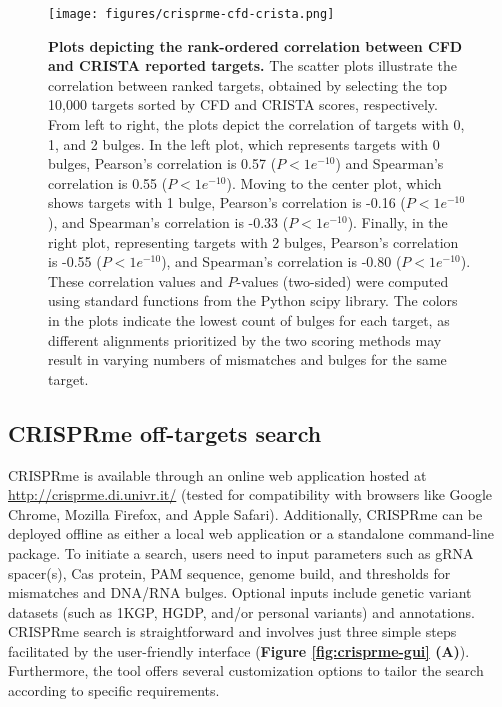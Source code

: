 \documentclass[a4paper, titlepage, openright]{book}
\newcommand{\crisprme}{CRISPRme\xspace}
\begin{document}
\begin{figure}[!]
    \centering
    \texttt{[image: figures/crisprme-cfd-crista.png]}
    \caption[Plots depicting the rank-ordered correlation between CFD and CRISTA reported targets]{\textbf{Plots depicting the rank-ordered correlation between CFD and CRISTA reported targets.} The scatter plots illustrate the correlation between ranked targets, obtained by selecting the top 10,000 targets sorted by CFD and CRISTA scores, respectively. From left to right, the plots depict the correlation of targets with 0, 1, and 2 bulges. In the left plot, which represents targets with 0 bulges, Pearson's correlation is 0.57 ($P < 1e^{-10}$) and Spearman's correlation is 0.55 ($P < 1e^{-10}$). Moving to the center plot, which shows targets with 1 bulge, Pearson's correlation is -0.16 ($P < 1e^{-10}$), and Spearman's correlation is -0.33 ($P < 1e^{-10}$). Finally, in the right plot, representing targets with 2 bulges, Pearson's correlation is -0.55 ($P < 1e^{-10}$), and Spearman's correlation is -0.80 ($P < 1e^{-10}$). These correlation values and $P$-values (two-sided) were computed using standard functions from the Python scipy library. The colors in the plots indicate the lowest count of bulges for each target, as different alignments prioritized by the two scoring methods may result in varying numbers of mismatches and bulges for the same target.\\ \hfill}
    \label{fig:crisprme-cfd-crista}
\end{figure}

\subsection{CRISPRme off-targets search}
CRISPRme is available through an online web application hosted at \url{http://crisprme.di.univr.it/} (tested for compatibility with browsers like Google Chrome, Mozilla Firefox, and Apple Safari). Additionally, \crisprme can be deployed offline as either a local web application or a standalone command-line package. To initiate a search, users need to input parameters such as gRNA spacer(s), Cas protein, PAM sequence, genome build, and thresholds for mismatches and DNA/RNA bulges. Optional inputs include genetic variant datasets (such as 1KGP, HGDP, and/or personal variants) and annotations. \crisprme search is straightforward and involves just three simple steps facilitated by the user-friendly interface (\textbf{Figure \ref{fig:crisprme-gui} (A)}). Furthermore, the tool offers several customization options to tailor the search according to specific requirements.
\end{document}
